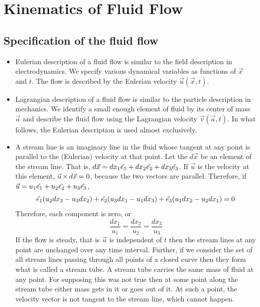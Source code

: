 \chapter{Kinematics of Fluid Flow}\label{c2}
\section{Specification of the fluid flow}\label{s1}
\begin{itemize}
\item Eulerian description of a fluid flow is similar to the field description in electrodynamics. We specify various dynamical variables as functions of $\vec{x}$ and $t$. The flow is 
described by the Eulerian velocity $\vec{u}(\vec{x}, t)$.

\item Lagrangian description of a fluid flow is similar to the particle description in mechanics. We identify a small enough element of fluid by its center of mass $\vec{a}$ and describe 
the fluid flow using the Lagrangian velocity $\vec{v}(\vec{a}, t)$. In what follows, the Eulerian description is used almost exclusively.

\item A stream line is an imaginary line in the fluid whose tangent at any point is parallel to the (Eulerian) velocity at that point. Let the $d\vec{x}$ be an element of the stream 
line. That is, $d\vec{x} = dx_1\hat{e_{1}} + dx_2\hat{e_{2}} + dx_3\hat{e_{3}}$. If $\vec{u}$ is the velocity at this element, $\vec{u} \operatorname{\times} d\vec{x} = 0$, because the two vectors are parallel. 
Therefore, 
if $\vec{u} = u_1\hat{e_{1}} + u_2\hat{e_{2}} + u_3\hat{e_{3}}$,
\[
\hat{e_{1}}(u_2 dx_3 - u_3dx_2) + \hat{e_{2}}(u_3dx_1 - u_1dx_3) + \hat{e_{3}}(u_1dx_2 - u_2dx_1) = 0
\]
Therefore, each component is zero, or
\[
\frac{dx_1}{u_1} = \frac{dx_2}{u_2} = \frac{dx_3}{u_3}
\]
If the flow is steady, that is $\vec{u}$ is independent of $t$ then the stream lines at any point are unchanged over any time interval. Further, if we consider the set of all stream lines
passing through all points of a closed curve then they form what is called a stream tube. A stream tube carries the same mass of fluid at any point. For supposing this was not true then 
at some point along the stream tube either mass gets in it or goes out of it. At such a point, the velocity vector is not tangent to the stream line, which cannot happen.


\end{itemize}
